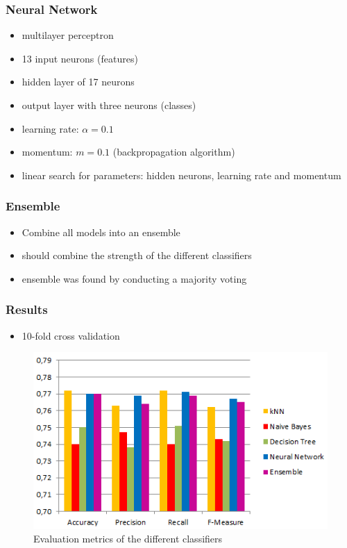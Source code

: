 \begin{frame}[fragile]
	\frametitle{Neural Network}
	\onslide<+->
	\begin{itemize}
		\item<+-> multilayer perceptron
		\item<+-> 13 input neurons (features)
		\item<+-> hidden layer of 17 neurons
		\item<+-> output layer with three neurons (classes)
		\item<+-> learning rate: \(\alpha=0.1\)
		\item<+-> momentum:  \(m=0.1\) (backpropagation algorithm)
		\item<+-> linear search for parameters: hidden neurons, learning rate and momentum
	\end{itemize}
\end{frame}

\begin{frame}
	\frametitle{Ensemble}
	\onslide<+->
	\begin{itemize}
		\item<+-> Combine all models into an ensemble
		\item<+-> should combine the strength of the different classifiers
		\item<+-> ensemble was found by conducting a majority voting
	\end{itemize}
\end{frame}


\begin{frame}
	\frametitle{Results}
	\begin{itemize}
		\item 10-fold cross validation
	\end{itemize}
	\begin{figure}[h]
		\centering
		\includegraphics[width=0.7\columnwidth]{../../charts/results.png}
		\caption{Evaluation metrics of the different classifiers}
		\label{fig:result}
	\end{figure}
\end{frame}

